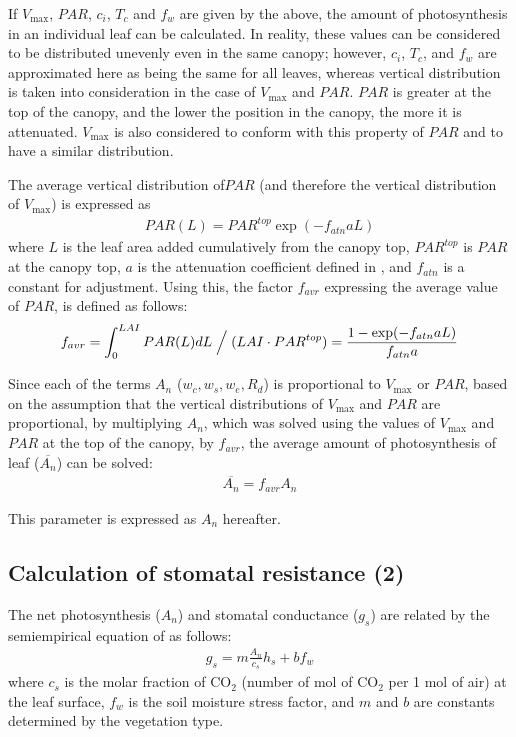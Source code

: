 If \(V_{\max}\), \(PAR\), \(c_i\), \(T_c\) and \(f_w\) are given by the above, the amount of photosynthesis in an individual leaf can be calculated. In reality, these values can be considered to be
distributed unevenly even in the same canopy; however, \(c_i\), \(T_c\), and \(f_w\) are approximated here as being the same for all leaves, whereas vertical distribution is taken into consideration
in the case of \(V_{\max}\) and \(PAR\). \(PAR\) is greater at the top of the canopy, and the lower the position in the canopy, the more it is attenuated. \(V_{\max}\) is also considered to conform
with this property of \(PAR\) and to have a similar distribution.

The average vertical distribution of\(PAR\) (and therefore the vertical distribution of \(V_{\max}\)) is expressed as \begin{eqnarray}
 PAR(L) = PAR^{top} \exp(- f_{atn} a L)
\end{eqnarray} where \(L\) is the leaf area added cumulatively from the canopy top, \(PAR^{top}\) is \(PAR\) at the canopy top, \(a\) is the attenuation coefficient defined in \hyperref[eq17]{}, and \(f_{atn}\)
is a constant for adjustment. Using this, the factor \(f_{avr}\) expressing the average value of \(PAR\), is defined as follows: \begin{eqnarray}
 f_{avr} = \int_0^{LAI} PAR(L) dL \Bigm / (LAI \cdot PAR^{top})
 = \frac{1 - \exp(- f_{atn} a L)}{f_{atn} a}
\end{eqnarray}

Since each of the terms \(A_n\) (\(w_c, w_s, w_e, R_d\)) is proportional to \(V_{\max}\) or \(PAR\), based on the assumption that the vertical distributions of \(V_{\max}\) and \(PAR\) are
proportional, by multiplying \(A_n\), which was solved using the values of \(V_{\max}\) and \(PAR\) at the top of the canopy, by \(f_{avr}\), the average amount of photosynthesis of leaf
(\(\overline{A_n}\)) can be solved: \begin{eqnarray}
 \overline{A_n} = f_{avr} A_n
\end{eqnarray}

This parameter is expressed as \(A_n\) hereafter.

\subsection{Calculation of stomatal resistance (2)}\label{calculation-of-stomatal-resistance-2}

The net photosynthesis (\(A_n\)) and stomatal conductance (\(g_s\)) are related by the semiempirical equation of \citet{Ball1988-jh} as follows: \begin{eqnarray}
 g_s = m \frac {A_n}{c_s} h_s + b f_w \label{eq93}
\end{eqnarray} where \(c_s\) is the molar fraction of \(\mathrm{CO_2}\) (number of mol of \(\mathrm{CO_2}\) per 1 mol of air) at the leaf surface, \(f_w\) is the soil moisture stress factor, and \(m\) and \(b\)
are constants determined by the vegetation type.

